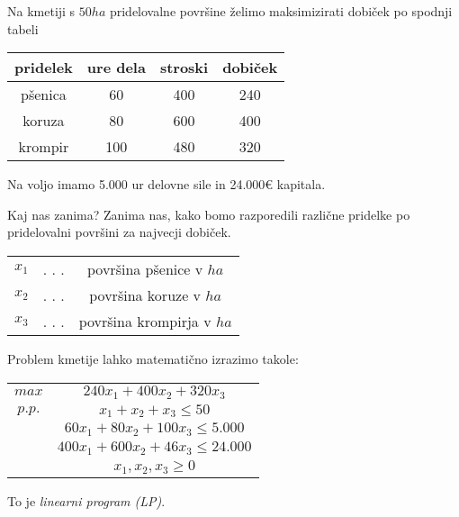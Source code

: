 \documentclass[11pt, a4paper]{article}
\begin{document}
        \begin{example}
            \par
            Na kmetiji s \(50 ha\) pridelovalne površine želimo maksimizirati dobiček po spodnji tabeli

            \begin{center}
                \begin{tabular}{ c|c|c|c }
                    pridelek & ure dela & stroski & dobiček \\
                    \hline
                    pšenica & 60 & 400 & 240 \\
                    koruza & 80 & 600 & 400 \\
                    krompir & 100 & 480 & 320 \\
                \end{tabular}
            \end{center}
            
            Na voljo imamo 5.000 ur delovne sile in 24.000€ kapitala.
            
            \par
            Kaj nas zanima? Zanima nas, kako bomo razporedili različne pridelke po pridelovalni površini za najvecji dobiček.

            
            \begin{tabular}{ c c c }
                \(x_1\) & . . . & površina pšenice v \(ha\) \\
                \(x_2\) & . . . & površina koruze v \(ha\) \\
                \(x_3\) & . . . & površina krompirja v \(ha\) \\
            \end{tabular}
            
            
            
            Problem kmetije lahko matematično izrazimo takole: \\

            \begin{center}
                \begin{tabular}{ cc }
                    $max$ & \(
                        240x_1+400x_2+320x_3
                    \) \\
                    $p.p.$ & \(
                        x_1+x_2+x_3 \le 50
                    \) \\
                    & \(
                        60x_1+80x_2+100x_3 \le 5.000
                    \) \\
                    & \(
                        400x_1+600x_2+46x_3 \le 24.000
                    \) \\
                    & \(
                        x_1,x_2,x_3 \ge 0    
                    \) \\
                \end{tabular}
            \end{center}

            To je \emph{linearni program (LP)}.
        \end{example}
\end{document}
